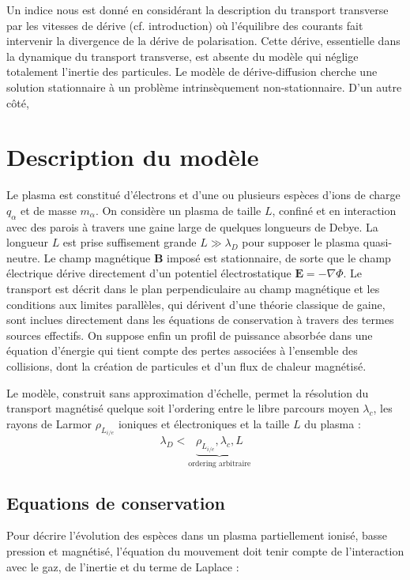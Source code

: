 \begin{refsection}
Un indice nous est donné en considérant la description du transport transverse
par les vitesses de dérive (cf.
introduction) où l'équilibre des courants fait intervenir la divergence de la
dérive de polarisation. Cette dérive, essentielle dans la dynamique du transport
transverse, est absente du modèle qui néglige totalement l'inertie des
particules. Le modèle de dérive-diffusion cherche une solution stationnaire à un
problème intrinsèquement non-stationnaire.
\parencite{Fruchtman}
\parencite{Sternberg}
D'un autre côté,

\section{Description du modèle}
Le plasma est constitué d'électrons et d'une ou plusieurs espèces d'ions de
charge $q_\alpha$ et de masse $m_\alpha$. On considère un plasma de taille $L$,
confiné et en interaction avec des parois à travers une gaine large de quelques longueurs
de Debye. La longueur $L$ est prise suffisement grande $L\gg\lambda_D$ pour
supposer le plasma quasi-neutre. Le champ magnétique $\mathbf{B}$ imposé est 
stationnaire, de sorte que le champ électrique dérive directement d'un 
potentiel électrostatique $\mathbf{E}=-\nabla \Phi$. Le transport est décrit
dans le plan perpendiculaire au champ magnétique et les conditions aux limites
parallèles, qui dérivent d'une théorie classique de gaine, sont
inclues directement dans les équations de conservation à travers des termes
sources effectifs. On suppose enfin un profil de puissance absorbée dans une
équation d'énergie qui tient compte des pertes associées à l'ensemble des
collisions, dont la création de particules et d'un flux de chaleur magnétisé.

Le modèle, construit sans approximation d'échelle, permet la résolution du
transport magnétisé quelque soit l'ordering entre le libre parcours moyen
$\lambda_c$, les rayons de Larmor $\rho_{L_{i/e}}$ ioniques et électroniques et
la taille $L$ du plasma :
\begin{equation*}
\lambda_D<\underbrace{\rho_{L_{i/e}},\lambda_c,L}_\text{ordering arbitraire}
\end{equation*}

\subsection{Equations de conservation}
Pour décrire l'évolution des espèces dans un plasma partiellement ionisé, basse
pression et magnétisé, l'équation du mouvement doit tenir compte de
l'interaction avec le gaz, de l'inertie et du terme de Laplace :


\end{refsection}
